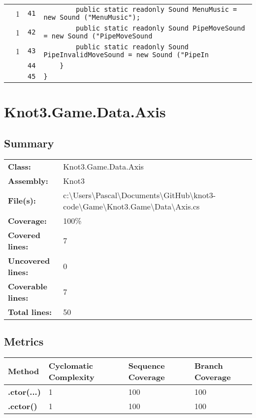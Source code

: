 \documentclass[a4paper,10pt]{article}
\begin{document}
\begin{longtable}[l]{lrrl}
\cellcolor{green} & 1 & \verb~41~ & \verb~        public static readonly Sound MenuMusic = new Sound ("MenuMusic");~\\
\cellcolor{green} & 1 & \verb~42~ & \verb~        public static readonly Sound PipeMoveSound = new Sound ("PipeMoveSound~\\
\cellcolor{green} & 1 & \verb~43~ & \verb~        public static readonly Sound PipeInvalidMoveSound = new Sound ("PipeIn~\\
\cellcolor{gray} &  & \verb~44~ & \verb~    }~\\
\cellcolor{gray} &  & \verb~45~ & \verb~}~\\
\end{longtable}
\newpage
\section{Knot3.Game.Data.Axis}
\subsection{Summary}
\begin{longtable}[l]{ll}
\textbf{Class:} & Knot3.Game.Data.Axis\\
\textbf{Assembly:} & Knot3\\
\textbf{File(s):} & \begin{minipage}[t]{12cm}{c:\textbackslash Users\textbackslash Pascal\textbackslash Documents\textbackslash GitHub\textbackslash knot3-code\textbackslash Game\textbackslash Knot3.Game\textbackslash Data\textbackslash Axis.cs}\end{minipage} \\
\textbf{Coverage:} & 100\%\\
\textbf{Covered lines:} & 7\\
\textbf{Uncovered lines:} & 0\\
\textbf{Coverable lines:} & 7\\
\textbf{Total lines:} & 50\\
\end{longtable}
\subsection{Metrics}
\begin{longtable}[l]{|l|l|l|l|}
\hline
\textbf{Method} & \textbf{Cyclomatic Complexity} & \textbf{Sequence Coverage} & \textbf{Branch Coverage}\\
\hline
\textbf{.ctor(...)} & 1 & 100 & 100\\
\hline
\textbf{.cctor()} & 1 & 100 & 100\\
\hline
\end{longtable}
\end{document}
